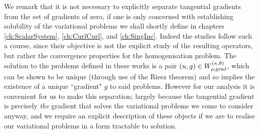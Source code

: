 We remark that it is not necessary to explicitly separate tangential gradients from the set of gradients of zero, if one is only concerned with establishing solubility of the variational problems we shall shortly define in chapters \ref{ch:ScalarSystem}, \ref{ch:CurlCurl}, and \ref{ch:SingInc}.
Indeed the studies \cite{zhikov2000extension, zhikov2002homogenization, cherednichenko2018operator, cherednichenko2022operator} follow such a course, since their objective is not the explicit study of the resulting operators, but rather the convergence properties for the homogenisation problem.
The solution to the problems defined in these works is a pair $\left( u,g \right)\in W^{\left( \kappa, \theta \right)}_{\rho,\mathrm{grad}}$, which can be shown to be unique (through use of the Riesz theorem) and so implies the existence of a unique ``gradient" $g$ to said problems.
However for our analysis it is convenient for us to make this separation; largely because the tangential gradient is precisely \emph{the} gradient that solves the variational problems we come to consider anyway, and we require an explicit description of these objects if we are to realise our variational problems in a form tractable to solution.

